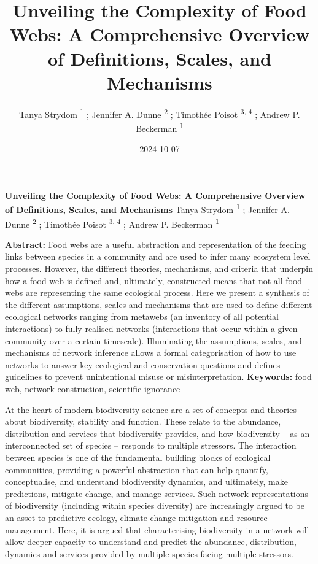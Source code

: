 \documentclass[
]{article}
\title{Unveiling the Complexity of Food Webs: A Comprehensive Overview
of Definitions, Scales, and Mechanisms}
\author{Tanya Strydom %
%
\textsuperscript{%
%
1%
}%
; Jennifer A. Dunne %
%
\textsuperscript{%
%
2%
}%
; Timothée Poisot %
%
\textsuperscript{%
3,%
4%
}%
; Andrew P. Beckerman %
%
\textsuperscript{%
%
1%
}%
}
\date{2024-10-07}
\begin{document}
\thispagestyle{empty}
{\bfseries\sffamily\Large Unveiling the Complexity of Food Webs: A
Comprehensive Overview of Definitions, Scales, and Mechanisms}
\vfil
Tanya Strydom %
%
\textsuperscript{%
%
1%
}%
; Jennifer A. Dunne %
%
\textsuperscript{%
%
2%
}%
; Timothée Poisot %
%
\textsuperscript{%
3,%
4%
}%
; Andrew P. Beckerman %
%
\textsuperscript{%
%
1%
}%

\vfil
{\small
\textbf{Abstract:} Food webs are a useful abstraction and representation
of the feeding links between species in a community and are used to
infer many ecosystem level processes. However, the different theories,
mechanisms, and criteria that underpin how a food web is defined and,
ultimately, constructed means that not all food webs are representing
the same ecological process. Here we present a synthesis of the
different assumptions, scales and mechanisms that are used to define
different ecological networks ranging from metawebs (an inventory of all
potential interactions) to fully realised networks (interactions that
occur within a given community over a certain timescale). Illuminating
the assumptions, scales, and mechanisms of network inference allows a
formal categorisation of how to use networks to answer key ecological
and conservation questions and defines guidelines to prevent
unintentional misuse or misinterpretation.
\vfil
\textbf{Keywords:} %
food web, network construction, %
scientific ignorance%
}
\clearpage
\setcounter{page}{1}
\doublespacing
\linenumbers


At the heart of modern biodiversity science are a set of concepts and
theories about biodiversity, stability and function. These relate to the
abundance, distribution and services that biodiversity provides, and how
biodiversity -- as an interconnected set of species -- responds to
multiple stressors. The interaction between species is one of the
fundamental building blocks of ecological communities, providing a
powerful abstraction that can help quantify, conceptualise, and
understand biodiversity dynamics, and ultimately, make predictions,
mitigate change, and manage services. Such network representations of
biodiversity (including within species diversity) are increasingly
argued to be an asset to predictive ecology, climate change mitigation
and resource management. Here, it is argued that characterising
biodiversity in a network will allow deeper capacity to understand and
predict the abundance, distribution, dynamics and services provided by
multiple species facing multiple stressors.
\end{document}
